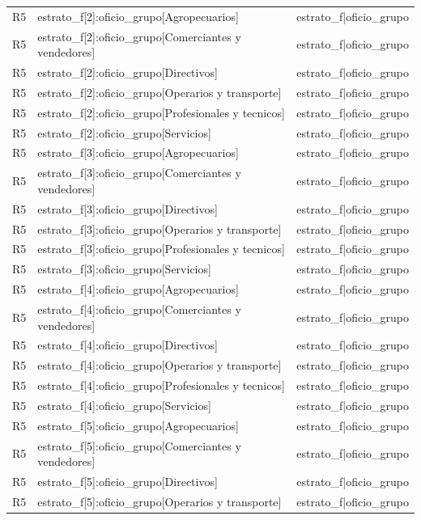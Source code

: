 \begin{longtable}{lll}
R5 & estrato\_f[2]:oficio\_grupo[Agropecuarios] & estrato\_f|oficio\_grupo \\
R5 & estrato\_f[2]:oficio\_grupo[Comerciantes y vendedores] & estrato\_f|oficio\_grupo \\
R5 & estrato\_f[2]:oficio\_grupo[Directivos] & estrato\_f|oficio\_grupo \\
R5 & estrato\_f[2]:oficio\_grupo[Operarios y transporte] & estrato\_f|oficio\_grupo \\
R5 & estrato\_f[2]:oficio\_grupo[Profesionales y tecnicos] & estrato\_f|oficio\_grupo \\
R5 & estrato\_f[2]:oficio\_grupo[Servicios] & estrato\_f|oficio\_grupo \\
R5 & estrato\_f[3]:oficio\_grupo[Agropecuarios] & estrato\_f|oficio\_grupo \\
R5 & estrato\_f[3]:oficio\_grupo[Comerciantes y vendedores] & estrato\_f|oficio\_grupo \\
R5 & estrato\_f[3]:oficio\_grupo[Directivos] & estrato\_f|oficio\_grupo \\
R5 & estrato\_f[3]:oficio\_grupo[Operarios y transporte] & estrato\_f|oficio\_grupo \\
R5 & estrato\_f[3]:oficio\_grupo[Profesionales y tecnicos] & estrato\_f|oficio\_grupo \\
R5 & estrato\_f[3]:oficio\_grupo[Servicios] & estrato\_f|oficio\_grupo \\
R5 & estrato\_f[4]:oficio\_grupo[Agropecuarios] & estrato\_f|oficio\_grupo \\
R5 & estrato\_f[4]:oficio\_grupo[Comerciantes y vendedores] & estrato\_f|oficio\_grupo \\
R5 & estrato\_f[4]:oficio\_grupo[Directivos] & estrato\_f|oficio\_grupo \\
R5 & estrato\_f[4]:oficio\_grupo[Operarios y transporte] & estrato\_f|oficio\_grupo \\
R5 & estrato\_f[4]:oficio\_grupo[Profesionales y tecnicos] & estrato\_f|oficio\_grupo \\
R5 & estrato\_f[4]:oficio\_grupo[Servicios] & estrato\_f|oficio\_grupo \\
R5 & estrato\_f[5]:oficio\_grupo[Agropecuarios] & estrato\_f|oficio\_grupo \\
R5 & estrato\_f[5]:oficio\_grupo[Comerciantes y vendedores] & estrato\_f|oficio\_grupo \\
R5 & estrato\_f[5]:oficio\_grupo[Directivos] & estrato\_f|oficio\_grupo \\
R5 & estrato\_f[5]:oficio\_grupo[Operarios y transporte] & estrato\_f|oficio\_grupo \\

\end{longtable}

